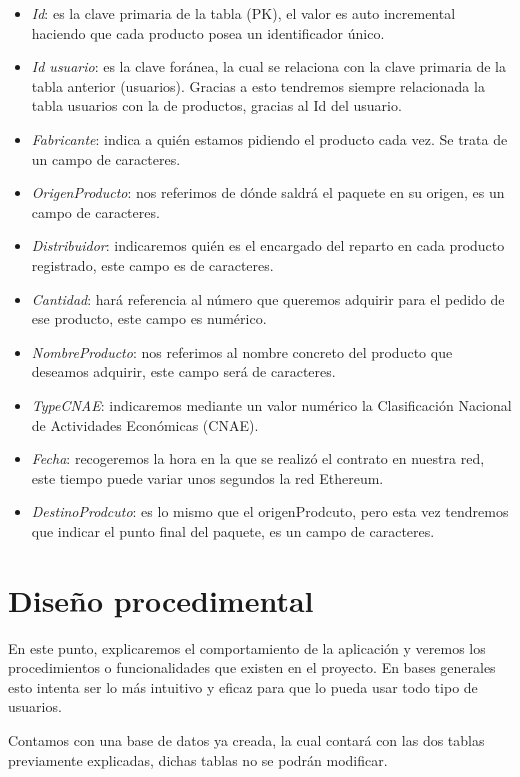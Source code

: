 \begin{itemize}
	\item \textit{Id}: es la clave primaria de la tabla (PK), el valor es auto incremental haciendo que cada producto posea un identificador único.
	\item \textit{Id usuario}: es la clave foránea, la cual se relaciona con la clave primaria de la tabla anterior (usuarios). Gracias a esto tendremos siempre relacionada la tabla usuarios con la de productos, gracias al Id del usuario.
	\item \textit{Fabricante}: indica a quién estamos pidiendo el producto cada vez. Se trata de un campo de caracteres.
	\item \textit{OrigenProducto}: nos referimos de dónde saldrá el paquete en su origen, es un campo de caracteres.
	\item \textit{Distribuidor}: indicaremos quién es el encargado del reparto en cada producto registrado, este campo es de caracteres. 
	\item \textit{Cantidad}: hará referencia al número que queremos adquirir para el pedido de ese producto, este campo es numérico. 
	\item \textit{NombreProducto}: nos referimos al nombre concreto del producto que deseamos adquirir, este campo será de caracteres.
	\item \textit{TypeCNAE}: indicaremos mediante un valor numérico la Clasificación Nacional de Actividades Económicas (CNAE).
	\item \textit{Fecha}: recogeremos la hora en la que se realizó el contrato en nuestra red, este tiempo puede variar unos segundos  la red Ethereum.
	\item \textit{DestinoProdcuto}: es lo mismo que el origenProdcuto, pero esta vez tendremos que indicar el punto final del paquete, es un campo de caracteres.	
\end{itemize}

\section{Diseño procedimental}

En este punto, explicaremos el comportamiento de la aplicación y veremos los procedimientos o funcionalidades que existen en el proyecto. En bases generales esto intenta ser lo más intuitivo y eficaz para que lo pueda usar todo tipo de usuarios.

Contamos con una base de datos ya creada, la cual contará con las dos tablas previamente explicadas, dichas tablas no se podrán modificar.

